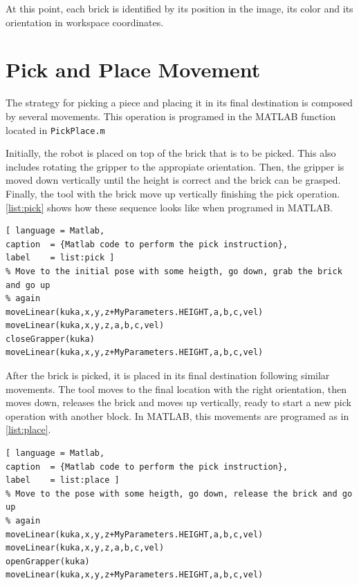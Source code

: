 At this point, each brick is identified by its position in the image, its color and its orientation in workspace coordinates.

\section{Pick and Place Movement}
The strategy for picking a piece and placing it in its final destination is composed by several movements. This operation is programed in the MATLAB function located in \lstinline[style=matlabinline]{PickPlace.m}

Initially, the robot is placed on top of the brick that is to be picked. This also includes rotating the gripper to the appropiate orientation. Then, the gripper is moved down vertically until the height is correct and the brick can be grasped. Finally, the tool with the brick move up vertically finishing the pick operation. \autoref{list:pick} shows how these sequence looks like when programed in MATLAB.
%
\begin{lstlisting}[ language = Matlab,
caption  = {Matlab code to perform the pick instruction},
label    = list:pick ]
% Move to the initial pose with some heigth, go down, grab the brick and go up
% again
moveLinear(kuka,x,y,z+MyParameters.HEIGHT,a,b,c,vel)
moveLinear(kuka,x,y,z,a,b,c,vel)
closeGrapper(kuka)
moveLinear(kuka,x,y,z+MyParameters.HEIGHT,a,b,c,vel)
\end{lstlisting}

After the brick is picked, it is placed in its final destination following similar movements. The tool moves to the final location with the right orientation, then moves down, releases the brick and moves up vertically, ready to start a new pick operation with another block. In MATLAB, this movements are programed as in \autoref{list:place}.
%
\begin{lstlisting}[ language = Matlab,
caption  = {Matlab code to perform the pick instruction},
label    = list:place ]
% Move to the pose with some heigth, go down, release the brick and go up
% again
moveLinear(kuka,x,y,z+MyParameters.HEIGHT,a,b,c,vel)
moveLinear(kuka,x,y,z,a,b,c,vel)
openGrapper(kuka)
moveLinear(kuka,x,y,z+MyParameters.HEIGHT,a,b,c,vel)
\end{lstlisting}